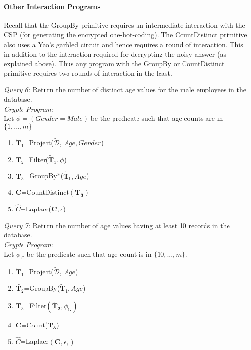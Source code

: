 \paragraph{\textbf{Other Interaction Programs}}
Recall that the \textsf{GroupBy} primitive requires an intermediate interaction with the \textsf{CSP} (for generating the encrypted one-hot-coding). The \textsf{CountDistinct} primitive also uses a Yao's garbled circuit and hence requires a round of interaction. This in addition to the interaction required for decrypting the noisy answer (as explained above). Thus any program with the \textsf{GroupBy} or \textsf{CountDistinct} primitive requires two rounds of interaction in the least. 
\begin{exmp}\textit{Query 6:} Return the number of distinct age values for the male employees in the database. \\ \textit{Crypt$\epsilon$ Program:} \\Let  $\phi=(Gender=Male)$ be the predicate such that age counts are in $\{1,...,m\}$ \begin{enumerate}\item $\mathbf{\tilde{T}}_1$=Project($\boldsymbol{\tilde{\mathcal{D}}}$, $Age,Gender$) \item $\mathbf{T}_2$=Filter($\mathbf{\tilde{T}}_1,\phi$) \item $\mathbf{T_3}$=GroupBy*($\mathbf{\tilde{T}}_1,Age$)\item $\mathbf{C}$=CountDistinct$(\mathbf{T_3})$\item $\hat{C}$=Laplace($\mathbf{C},\epsilon$)\end{enumerate}\end{exmp} \begin{exmp}\textit{Query 7:} Return the number of  age values having at least 10 records in the database. \\ \textit{Crypt$\epsilon$ Program}:\\ Let $\phi_G$ be the predicate such that age count is in $\{10,...,m\}$. \begin{enumerate}\item $\mathbf{\tilde{T}}_1$=Project($\boldsymbol{\tilde{\mathcal{D}}}$, $Age$) \item $\mathbf{\tilde{T_2}}$=GroupBy($\mathbf{\tilde{T}}_1,Age$)\item $\mathbf{T_3}$=Filter$(\mathbf{\tilde{T_2}},\phi_G)$\item $\mathbf{C}$=Count($\mathbf{T_3}$)\item $\hat{C}$=Laplace$(\mathbf{C},\epsilon,)$\end{enumerate}\end{exmp}